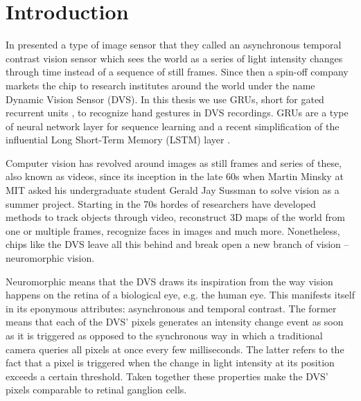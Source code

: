 \chapter{Introduction}
\label{cha:introduction}

In \citeyear{dvs} \citeauthor{dvs} presented a type of image sensor that they
called an asynchronous temporal contrast vision sensor \cite{dvs} which sees the
world as a series of light intensity changes through time instead of a sequence
of still frames. Since then a spin-off company markets the chip to research
institutes around the world under the name Dynamic Vision Sensor (DVS). In this
thesis we use GRUs, short for gated recurrent units \cite{gru}, to recognize
hand gestures in DVS recordings. GRUs are a type of neural network layer for
sequence learning and a recent simplification of the influential Long Short-Term
Memory (LSTM) layer \cite{lstm}.

Computer vision has revolved around images as still frames and series of these,
also known as videos, since its inception in the late 60s when Martin Minsky at
MIT asked his undergraduate student Gerald Jay Sussman to solve vision as a
summer project. Starting in the 70s hordes of researchers have developed methods
to track objects through video, reconstruct 3D maps of the world from one or
multiple frames, recognize faces in images and much more. Nonetheless, chips
like the DVS leave all this behind and break open a new branch of vision --
neuromorphic vision.

Neuromorphic means that the DVS draws its inspiration from the way vision
happens on the retina of a biological eye, e.g. the human eye. This manifests
itself in its eponymous attributes: asynchronous and temporal contrast. The
former means that each of the DVS' pixels generates an intensity change event as
soon as it is triggered as opposed to the synchronous way in which a traditional
camera queries all pixels at once every few milliseconds. The latter refers to
the fact that a pixel is triggered when the change in light intensity at its
position exceeds a certain threshold. Taken together these properties make the
DVS' pixels comparable to retinal ganglion cells.

